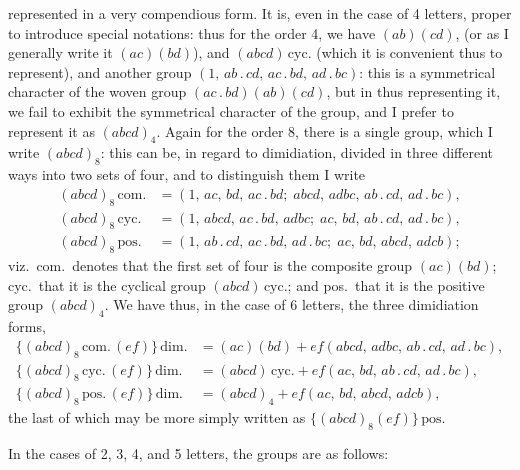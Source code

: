 \documentclass[11pt]{article}
\begin{document}
\smallskip
represented in a very compendious form. It is, even in the case of 4
letters, proper to introduce special notations: thus for the order 4, we
have $(ab)(cd)$, (or as I generally write it $(ac)(bd)$), and
$(abcd)\,\text{cyc.}$ (which it is convenient thus to represent), and
another group $(1,\,ab\,.\,cd,\,ac\,.\,bd,\,ad\,.\,bc)$: this is a
symmetrical character of the woven group $(ac\,.\,bd)(ab)(cd)$, but in
thus representing it, we fail to exhibit the symmetrical character of the
group, and I prefer to represent it as $(abcd)_{4}$. Again for the order 8,
there is a single group, which I write $(abcd)_{8}$: this can be, in regard
to dimidiation, divided in three different ways into two sets of four, and
to distinguish them I write
\begin{align*}
(abcd)_{8}\,\text{com.} &= (1,\,ac,\,bd,\,ac\,.\,bd;\;abcd,\,adbc,\,ab\,.\,cd,\,ad\,.\,bc),\\
(abcd)_{8}\,\text{cyc.} &= (1,\,abcd,\,ac\,.\,bd,\,adbc;\;ac,\,bd,\,ab\,.\,cd,\,ad\,.\,bc),\\
(abcd)_{8}\,\text{pos.} &= (1,\,ab\,.\,cd,\,ac\,.\,bd,\,ad\,.\,bc;\;ac,\,bd,\,abcd,\,adcb);
\end{align*}
viz.\ com.\ denotes that the first set of four is the composite group
$(ac)(bd)$; cyc.\ that it is the cyclical group $(abcd)\,\text{cyc.}$;
and pos.\ that it is the positive group $(abcd)_{4}$. We have thus, in the
case of 6 letters, the three dimidiation forms,
\begin{align*}
\{(abcd)_{8}\,\text{com.}\,(ef)\}\,\text{dim.} &= (ac)(bd)+ef(abcd,\,adbc,\,ab\,.\,cd,\,ad\,.\,bc),\\
\{(abcd)_{8}\,\text{cyc.}\,(ef)\}\,\text{dim.} &= (abcd)\,\text{cyc.}+ef(ac,\,bd,\,ab\,.\,cd,\,ad\,.\,bc),\\
\{(abcd)_{8}\,\text{pos.}\,(ef)\}\,\text{dim.} &= (abcd)_{4}+ef(ac,\,bd,\,abcd,\,adcb),
\end{align*}
the last of which may be more simply written as
$\{(abcd)_{8}(ef)\}\,\text{pos.}$

\hspace{1em} In the cases of 2, 3, 4, and 5 letters, the groups are as
follows:
\end{document}
